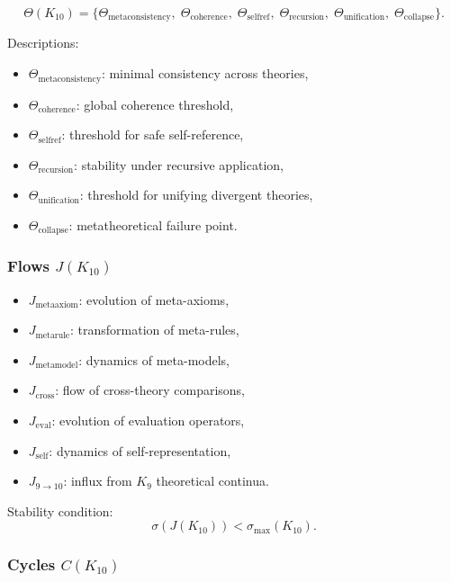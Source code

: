 \[
\Theta(K_{10})=
\{
\Theta_{\mathrm{metaconsistency}},\;
\Theta_{\mathrm{coherence}},\;
\Theta_{\mathrm{selfref}},\;
\Theta_{\mathrm{recursion}},\;
\Theta_{\mathrm{unification}},\;
\Theta_{\mathrm{collapse}}
\}.
\]

Descriptions:
\begin{itemize}
    \item $\Theta_{\mathrm{metaconsistency}}$: minimal consistency across theories,
    \item $\Theta_{\mathrm{coherence}}$: global coherence threshold,
    \item $\Theta_{\mathrm{selfref}}$: threshold for safe self-reference,
    \item $\Theta_{\mathrm{recursion}}$: stability under recursive application,
    \item $\Theta_{\mathrm{unification}}$: threshold for unifying divergent theories,
    \item $\Theta_{\mathrm{collapse}}$: metatheoretical failure point.
\end{itemize}

\subsubsection{Flows $J(K_{10})$}

\begin{itemize}
    \item $J_{\mathrm{metaaxiom}}$: evolution of meta-axioms,
    \item $J_{\mathrm{metarule}}$: transformation of meta-rules,
    \item $J_{\mathrm{metamodel}}$: dynamics of meta-models,
    \item $J_{\mathrm{cross}}$: flow of cross-theory comparisons,
    \item $J_{\mathrm{eval}}$: evolution of evaluation operators,
    \item $J_{\mathrm{self}}$: dynamics of self-representation,
    \item $J_{9\to10}$: influx from $K_9$ theoretical continua.
\end{itemize}

Stability condition:
\[
\sigma(J(K_{10})) < \sigma_{\max}(K_{10}).
\]

\subsubsection{Cycles $C(K_{10})$}

